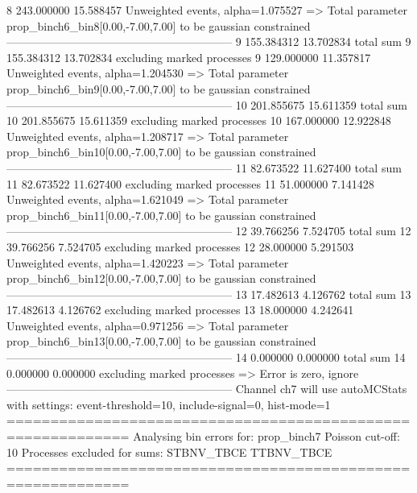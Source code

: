 8          243.000000      15.588457       Unweighted events, alpha=1.075527
  => Total parameter prop_binch6_bin8[0.00,-7.00,7.00] to be gaussian constrained
------------------------------------------------------------
9          155.384312      13.702834       total sum                     
9          155.384312      13.702834       excluding marked processes    
9          129.000000      11.357817       Unweighted events, alpha=1.204530
  => Total parameter prop_binch6_bin9[0.00,-7.00,7.00] to be gaussian constrained
------------------------------------------------------------
10         201.855675      15.611359       total sum                     
10         201.855675      15.611359       excluding marked processes    
10         167.000000      12.922848       Unweighted events, alpha=1.208717
  => Total parameter prop_binch6_bin10[0.00,-7.00,7.00] to be gaussian constrained
------------------------------------------------------------
11         82.673522       11.627400       total sum                     
11         82.673522       11.627400       excluding marked processes    
11         51.000000       7.141428        Unweighted events, alpha=1.621049
  => Total parameter prop_binch6_bin11[0.00,-7.00,7.00] to be gaussian constrained
------------------------------------------------------------
12         39.766256       7.524705        total sum                     
12         39.766256       7.524705        excluding marked processes    
12         28.000000       5.291503        Unweighted events, alpha=1.420223
  => Total parameter prop_binch6_bin12[0.00,-7.00,7.00] to be gaussian constrained
------------------------------------------------------------
13         17.482613       4.126762        total sum                     
13         17.482613       4.126762        excluding marked processes    
13         18.000000       4.242641        Unweighted events, alpha=0.971256
  => Total parameter prop_binch6_bin13[0.00,-7.00,7.00] to be gaussian constrained
------------------------------------------------------------
14         0.000000        0.000000        total sum                     
14         0.000000        0.000000        excluding marked processes    
  => Error is zero, ignore      
------------------------------------------------------------
Channel ch7 will use autoMCStats with settings: event-threshold=10, include-signal=0, hist-mode=1
============================================================
Analysing bin errors for: prop_binch7
Poisson cut-off: 10
Processes excluded for sums: STBNV_TBCE TTBNV_TBCE
============================================================
